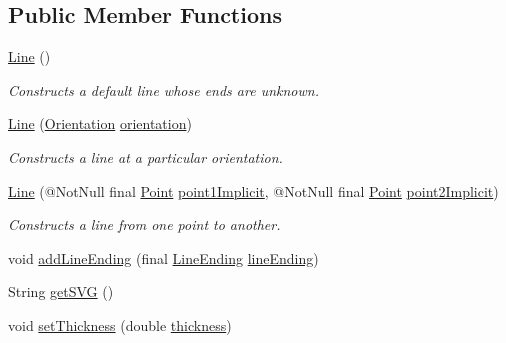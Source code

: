 \subsection*{Public Member Functions}
\begin{DoxyCompactItemize}
\item 
\hyperlink{classcom_1_1aarrelaakso_1_1drawl_1_1_line_af96a733c80d52bf419cab52fb09bc514}{Line} ()
\begin{DoxyCompactList}\small\item\em Constructs a default line whose ends are unknown. \end{DoxyCompactList}\item 
\hyperlink{classcom_1_1aarrelaakso_1_1drawl_1_1_line_aaeb9fdd60eeec26d881cb88a23c116b5}{Line} (\hyperlink{enumcom_1_1aarrelaakso_1_1drawl_1_1_line_1_1_orientation}{Orientation} \hyperlink{classcom_1_1aarrelaakso_1_1drawl_1_1_line_a441ce546831b219e01f5fd0f7e0bb3b1}{orientation})
\begin{DoxyCompactList}\small\item\em Constructs a line at a particular orientation. \end{DoxyCompactList}\item 
\hyperlink{classcom_1_1aarrelaakso_1_1drawl_1_1_line_a9e956655eba16543d82728923c3eb4f6}{Line} (@Not\+Null final \hyperlink{classcom_1_1aarrelaakso_1_1drawl_1_1_point}{Point} \hyperlink{classcom_1_1aarrelaakso_1_1drawl_1_1_line_a48220286707ae05387f9c99d9e08784c}{point1\+Implicit}, @Not\+Null final \hyperlink{classcom_1_1aarrelaakso_1_1drawl_1_1_point}{Point} \hyperlink{classcom_1_1aarrelaakso_1_1drawl_1_1_line_a055d1e743c66cc808f108664b38d7de2}{point2\+Implicit})
\begin{DoxyCompactList}\small\item\em Constructs a line from one point to another. \end{DoxyCompactList}\item 
void \hyperlink{classcom_1_1aarrelaakso_1_1drawl_1_1_line_ae596a9a32b970e2b5157db03dc023afc}{add\+Line\+Ending} (final \hyperlink{classcom_1_1aarrelaakso_1_1drawl_1_1_line_ending}{Line\+Ending} \hyperlink{classcom_1_1aarrelaakso_1_1drawl_1_1_line_a8b339d5d292d8584536ba0c19478bb27}{line\+Ending})
\item 
String \hyperlink{classcom_1_1aarrelaakso_1_1drawl_1_1_line_a6a54dd70515b691c8afa88f980e10698}{get\+S\+VG} ()
\item 
void \hyperlink{classcom_1_1aarrelaakso_1_1drawl_1_1_line_af58511076072e05cf42641ee44d0d0d7}{set\+Thickness} (double \hyperlink{classcom_1_1aarrelaakso_1_1drawl_1_1_line_a314ae0371f5665cf70ad99742d44934a}{thickness})

\end{DoxyCompactItemize}
